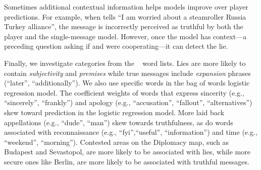 Sometimes additional contextual information helps models improve over player predictions.
%
For example, when  tells  ``I am worried
about a steamroller Russia Turkey alliance'', the message is incorrectly perceived
as truthful by both the player and the single-message model.
%
However, once the model has context---a preceding question asking if
 and  were cooperating---it can
detect the lie.
%
%
%


Finally, we investigate categories from the \wordlist{}~\citep{
  niculaelinguistic} word lists.
%
Lies are more likely to contain
\textit{subjectivity} and \textit{premises} while
true messages include \textit{expansion} phrases (``later'',
``additionally'').  We also use specific words in the bag of words logistic regression
model.
%
The coefficient weights of words that express sincerity (e.g., ``sincerely'', ``frankly'') and
apology (e.g., ``accusation'', ``fallout'', ``alternatives'') skew toward
\alie{} prediction in the logistic regression model.
%
More laid back appellations (e.g., ``dude'', ``man'') skew towards
truthfulness, as do words associated with reconnaissance (e.g., ``fyi'',``useful'', ``information'') and time (e.g.,
``weekend'', ``morning'').
%
Contested areas on the Diplomacy map, such as
Budapest and Sevastopol, are more likely to be associated with lies,
while more secure ones like Berlin, are more likely to be associated
with truthful messages.
%
%



